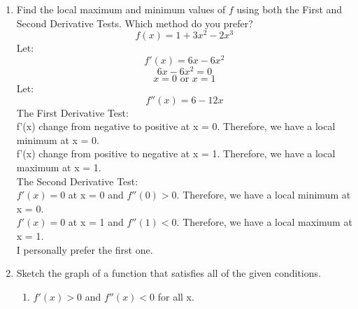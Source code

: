 \documentclass[12pt]{article}
\begin{document}
\begin{enumerate}
        \item Find the local maximum and minimum values of $f$ using both the First and Second Derivative Tests. Which method do you prefer?
            \[f(x) = 1 + 3x^2 - 2x^3\]
        Let:
            \[f'(x) = 6x - 6x^2\]
            \[6x - 6x^2 = 0\]
            \[x = 0 \text{ or } x = 1\]
        Let:
            \[f''(x) = 6 - 12x\]
        The First Derivative Test:\\
            f'(x) change from negative to positive at x = 0. Therefore, we have a local minimum at x = 0.\\
            f'(x) change from positive to negative at x = 1. Therefore, we have a local maximum at x = 1.\\
        The Second Derivative Test:\\
            $f'(x) = 0$ at x = 0 and $f''(0) > 0$. Therefore, we have a local minimum at x = 0.\\
            $f'(x) = 0$ at x = 1 and $f''(1) < 0$. Therefore, we have a local maximum at x = 1.\\
        I personally prefer the first one.
        \setcounter{enumi}{28}
        \newpage
        \item Sketch the graph of a function that satisfies all of the given conditions.
        \begin{enumerate}
            \item $f'(x) > 0$ and $f''(x) < 0$ for all x.
            \begin{figure}[!h]      
                \begin{framed}
                    \centering  
\end{framed}
\end{figure}
\end{enumerate}
\end{enumerate}
\end{document}
